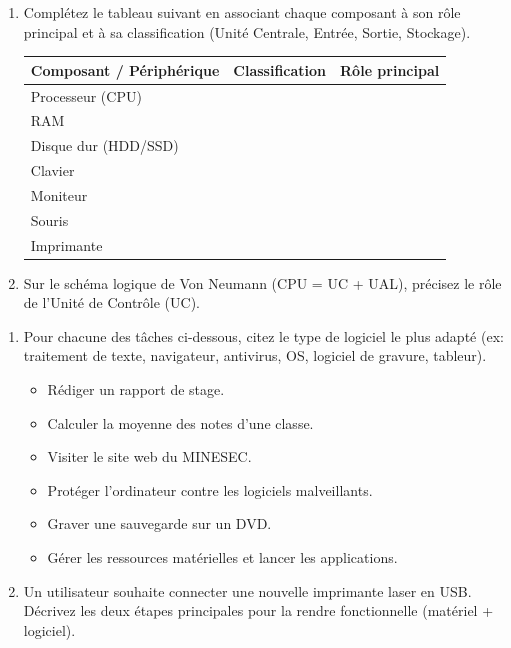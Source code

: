 \documentclass[11pt]{article}
\begin{document}
\begin{exercice}
\begin{enumerate}
    \item Complétez le tableau suivant en associant chaque composant à son rôle principal et à sa classification (Unité Centrale, Entrée, Sortie, Stockage).
    \begin{tabularx}{\linewidth}{|X|c|X|}
    \hline
    \textbf{Composant / Périphérique} & \textbf{Classification} & \textbf{Rôle principal} \\
    \hline
    Processeur (CPU) & & \\
    \hline
    RAM & & \\
    \hline
    Disque dur (HDD/SSD) & & \\
    \hline
    Clavier & & \\
    \hline
    Moniteur & & \\
    \hline
    Souris & & \\
    \hline
    Imprimante & & \\
    \hline
    \end{tabularx}
    \item Sur le schéma logique de Von Neumann (CPU = UC + UAL), précisez le rôle de l'Unité de Contrôle (UC).
\end{enumerate}
\end{exercice}

\begin{exercice}
\begin{enumerate}
    \item Pour chacune des tâches ci-dessous, citez le type de logiciel le plus adapté (ex: traitement de texte, navigateur, antivirus, OS, logiciel de gravure, tableur).
    \begin{itemize}
        \item Rédiger un rapport de stage.
        \item Calculer la moyenne des notes d'une classe.
        \item Visiter le site web du MINESEC.
        \item Protéger l'ordinateur contre les logiciels malveillants.
        \item Graver une sauvegarde sur un DVD.
        \item Gérer les ressources matérielles et lancer les applications.
    \end{itemize}
    \item Un utilisateur souhaite connecter une nouvelle imprimante laser en USB. Décrivez les deux étapes principales pour la rendre fonctionnelle (matériel + logiciel).
\end{enumerate}
\end{exercice}
\end{document}
